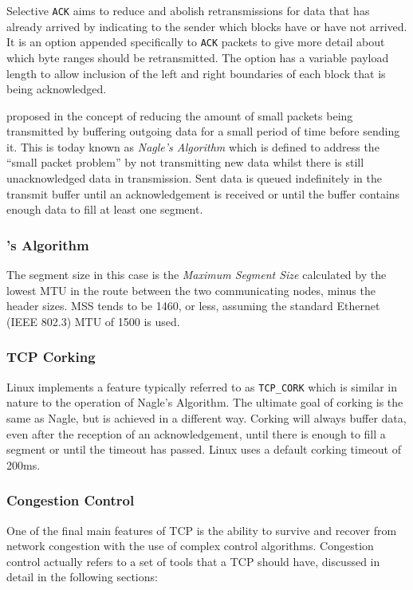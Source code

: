             Selective \texttt{ACK} aims to reduce and abolish retransmissions for data that has already arrived by indicating to the sender which blocks have or have not arrived. It is an option appended specifically to \texttt{ACK} packets to give more detail about which byte ranges should be retransmitted. The option has a variable payload length to allow inclusion of the left and right boundaries of each block that is being acknowledged.

            \citeauthor{rfc896} proposed in \citeyear{rfc896} the concept of reducing the amount of small packets being transmitted by buffering outgoing data for a small period of time before sending it. This is today known as \textit{Nagle's Algorithm} which is defined to address the ``small packet problem'' by not transmitting new data whilst there is still unacknowledged data in transmission. Sent data is queued indefinitely in the transmit buffer until an acknowledgement is received or until the buffer contains enough data to fill at least one segment.
        \subsubsection{\citeauthor{rfc896}'s Algorithm}

            The segment size in this case is the \textit{Maximum Segment Size} calculated by the lowest MTU in the route between the two communicating nodes, minus the header sizes. MSS tends to be 1460, or less, assuming the standard Ethernet (IEEE 802.3) MTU of 1500 is used.

        \subsubsection{TCP Corking}
            Linux implements a feature typically referred to as \texttt{TCP\_CORK} which is similar in nature to the operation of Nagle's Algorithm. The ultimate goal of corking is the same as Nagle, but is achieved in a different way. Corking will always buffer data, even after the reception of an acknowledgement, until there is enough to fill a segment or until the timeout has passed.  Linux uses a default corking timeout of 200ms.

        \subsubsection{Congestion Control}
            One of the final main features of TCP is the ability to survive and recover from network congestion with the use of complex control algorithms. Congestion control actually refers to a set of tools that a TCP should have, discussed in detail in the following sections:


